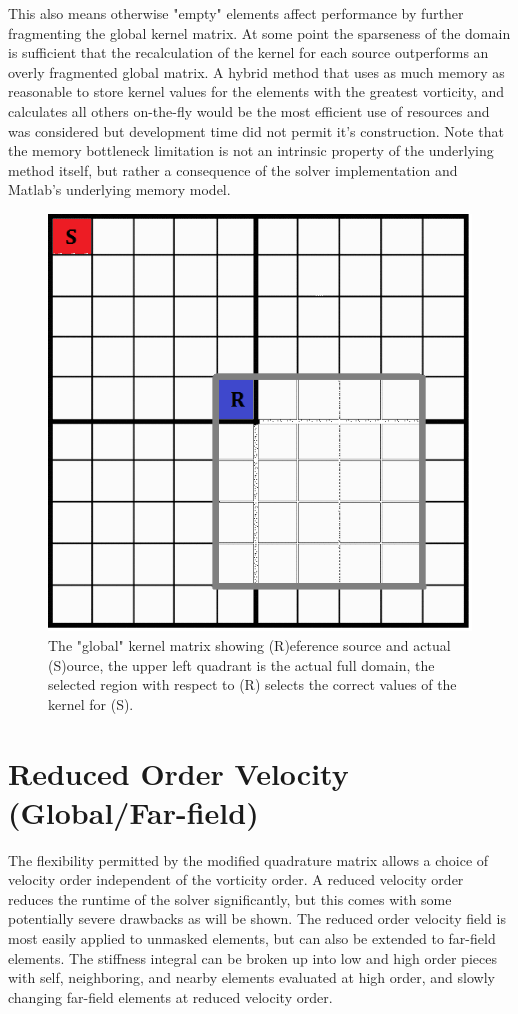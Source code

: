 \documentclass[letterpaper,12pt]{report}
\begin{document}
This also means otherwise "empty" elements affect performance by further fragmenting the global kernel matrix. At some point the sparseness of the domain is sufficient that the recalculation of the kernel for each source outperforms an overly fragmented global matrix. A hybrid method that uses as much memory as reasonable to store kernel values for the elements with the greatest vorticity, and calculates all others on-the-fly would be the most efficient use of resources and was considered but development time did not permit it's construction. Note that the memory bottleneck limitation is not an intrinsic property of the underlying method itself, but rather a consequence of the solver implementation and Matlab's underlying memory model.

\begin{figure}
\centering
\includegraphics[width=5.5in]{GlobalKernel.PNG}
\caption{\label{fig:GlobalKernel}The "global" kernel matrix showing (R)eference source and actual (S)ource, the upper left quadrant is the actual full domain, the selected region with respect to (R) selects the correct values of the kernel for (S).}
\end{figure}

%
\section{Reduced Order Velocity (Global/Far-field)}
The flexibility permitted by the modified quadrature matrix allows a choice of velocity order independent of the vorticity order. A reduced velocity order reduces the runtime of the solver significantly, but this comes with some potentially severe drawbacks as will be shown. The reduced order velocity field is most easily applied to unmasked elements, but can also be extended to far-field elements. The stiffness integral can be broken up into low and high order pieces with self, neighboring, and nearby elements evaluated at high order, and slowly changing far-field elements at reduced velocity order.
\end{document}

